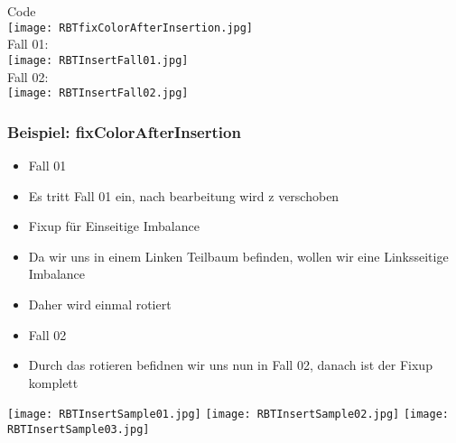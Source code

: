 			\hspace{1cm}
			\begin{minipage}{0.45\textwidth}
				\begin{center}
					Code \\
					\texttt{[image: RBTfixColorAfterInsertion.jpg]} \\
					\vspace{1cm}
					Fall 01: \\
					\texttt{[image: RBTInsertFall01.jpg]} \\
					Fall 02: \\
					\texttt{[image: RBTInsertFall02.jpg]} \\
				\end{center}
			\end{minipage}


		\subsubsection{Beispiel: fixColorAfterInsertion}
			\begin{minipage}[t]{0.35\textwidth}
				\vspace{2cm}
				\begin{itemize}
					\item Fall 01
					\item Es tritt Fall 01 ein, nach bearbeitung wird z verschoben
				\end{itemize}
				\vspace{2cm}
				\begin{itemize}
					\item Fixup für Einseitige Imbalance
					\item Da wir uns in einem Linken Teilbaum befinden, wollen wir eine Linksseitige Imbalance
					\item Daher wird einmal rotiert
				\end{itemize}
				\vspace{1.5cm}
				\begin{itemize}
					\item Fall 02
					\item Durch das rotieren befidnen wir uns nun in Fall 02, danach ist der Fixup komplett
				\end{itemize}
			\end{minipage}
			\hspace{1cm}
			\begin{minipage}[t]{0.6\textwidth}
				\begin{center}
					\texttt{[image: RBTInsertSample01.jpg]}
					\texttt{[image: RBTInsertSample02.jpg]}
					\texttt{[image: RBTInsertSample03.jpg]}
				\end{center}
			\end{minipage}



